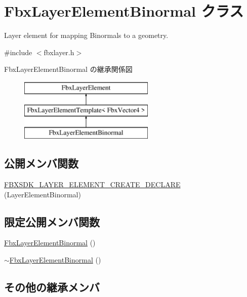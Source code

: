 \hypertarget{class_fbx_layer_element_binormal}{}\section{Fbx\+Layer\+Element\+Binormal クラス}
\label{class_fbx_layer_element_binormal}


Layer element for mapping Binormals to a geometry.  




{\ttfamily \#include $<$fbxlayer.\+h$>$}

Fbx\+Layer\+Element\+Binormal の継承関係図\begin{figure}[H]
\begin{center}
\leavevmode
\includegraphics[height=3.000000cm]{class_fbx_layer_element_binormal}
\end{center}
\end{figure}
\subsection*{公開メンバ関数}
\begin{DoxyCompactItemize}
\item 
\hyperlink{class_fbx_layer_element_binormal_abe45283c25e5d9f9d079886a7a1a3767}{F\+B\+X\+S\+D\+K\+\_\+\+L\+A\+Y\+E\+R\+\_\+\+E\+L\+E\+M\+E\+N\+T\+\_\+\+C\+R\+E\+A\+T\+E\+\_\+\+D\+E\+C\+L\+A\+RE} (Layer\+Element\+Binormal)
\end{DoxyCompactItemize}
\subsection*{限定公開メンバ関数}
\begin{DoxyCompactItemize}
\item 
\hyperlink{class_fbx_layer_element_binormal_a6071e29087d2027cb6e2c66dfcb07506}{Fbx\+Layer\+Element\+Binormal} ()
\item 
\hyperlink{class_fbx_layer_element_binormal_af7376b512370ceb1a53a22325d6c12a7}{$\sim$\+Fbx\+Layer\+Element\+Binormal} ()
\end{DoxyCompactItemize}
\subsection*{その他の継承メンバ}


